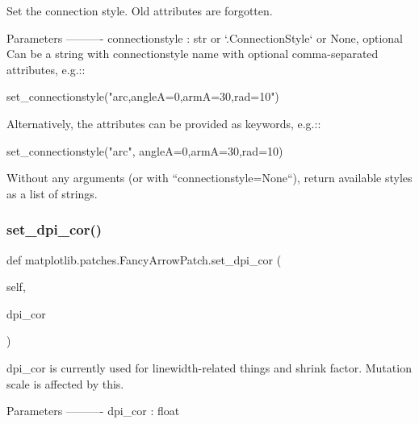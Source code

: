 \begin{DoxyVerb}Set the connection style. Old attributes are forgotten.

Parameters
----------
connectionstyle : str or `.ConnectionStyle` or None, optional
    Can be a string with connectionstyle name with
    optional comma-separated attributes, e.g.::

set_connectionstyle("arc,angleA=0,armA=30,rad=10")

    Alternatively, the attributes can be provided as keywords, e.g.::

set_connectionstyle("arc", angleA=0,armA=30,rad=10)

    Without any arguments (or with ``connectionstyle=None``), return
    available styles as a list of strings.
\end{DoxyVerb}
 \mbox{\label{classmatplotlib_1_1patches_1_1FancyArrowPatch_a8ef7fd95491988643492bbf37accf87e}} 
\subsubsection{\texorpdfstring{set\+\_\+dpi\+\_\+cor()}{set\_dpi\_cor()}}
{\footnotesize\ttfamily def matplotlib.\+patches.\+Fancy\+Arrow\+Patch.\+set\+\_\+dpi\+\_\+cor (\begin{DoxyParamCaption}\item[{}]{self,  }\item[{}]{dpi\+\_\+cor }\end{DoxyParamCaption})}

\begin{DoxyVerb}dpi_cor is currently used for linewidth-related things and
shrink factor. Mutation scale is affected by this.

Parameters
----------
dpi_cor : float
\end{DoxyVerb}
 \mbox{\label{classmatplotlib_1_1patches_1_1FancyArrowPatch_a213595673a4aa3a4d69e374469421879}} 
